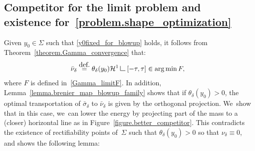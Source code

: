 \documentclass[11pt]{article}
\numberwithin{equation}{section}
\theoremstyle{definition}
\newcommand{\eqdef}{\ensuremath{\stackrel{\mbox{\upshape\tiny def.}}{=}}}
\newcommand\LM[1]{\hbox{\vrule width.5pt \vbox to#1pt{\vfill \hrule width#1pt height.5pt}}}
\newcommand\LL{{\mathchoice {\>\LM7\>}{\>\LM7\>}{\,\LM5\,}{\,\LM{3.35}\,}}}
\newcommand{\mres}{\LL}
\newcommand\cH{\mathcal{H}}
\DeclareMathOperator*{\argmin}{arg\,min}
\begin{document}
\subsection{Competitor for the limit problem and existence for~\eqref{problem.shape_optimization}}

Given $y_0\in \Sigma$ such that \eqref{y0fixed_for_blowup} holds, it follows from Theorem~\ref{theorem.Gamma_convergence} that:
\[
\bar \nu_{\delta} \eqdef \theta_\delta(y_0)\cH^1\mres [-\tau, \tau]
\in
\argmin F,
\]
where $F$ is defined in~\eqref{Gamma_limitF}.
In addition, Lemma~\ref{lemma.brenier_map_blowup_family} shows that if $\theta_\delta(y_0)>0$, the optimal transportation of $\bar \sigma_{\delta}$ to $\bar \nu_{\delta}$ is given by the orthogonal projection. We~show that in this case, we~can lower the energy by projecting part of the mass to a (closer) horizontal line as in Figure~\ref{figure.better_competitor}.
This contradicts the existence of rectifiability points of~$\Sigma$ such that $\theta_\delta(y_0) > 0$ so that $\nu_\delta \equiv 0$, and shows the following lemma:
\end{document}
